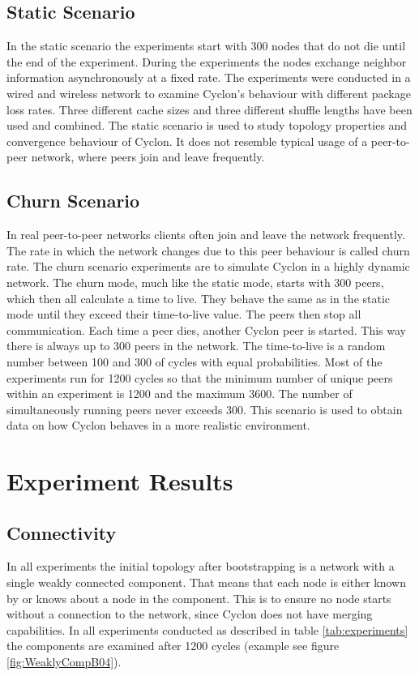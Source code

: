 \subsection{Static Scenario}
In the static scenario the experiments start with 300 nodes that do not die
until the end of the experiment. During the experiments the nodes exchange
neighbor information asynchronously at a fixed rate. The experiments were
conducted in a wired and wireless network to examine Cyclon's behaviour with
different package loss rates. Three different cache sizes and three different
shuffle lengths have been used and combined. The static scenario is used to
study topology properties and convergence behaviour of Cyclon. It does not
resemble typical usage of a peer-to-peer network, where peers join and leave
frequently.
\subsection{Churn Scenario}
In real peer-to-peer networks clients often join and leave the network
frequently. The rate in which the network changes due to this peer behaviour is
called churn rate. The churn scenario experiments are to simulate Cyclon in a
highly dynamic network. The churn mode, much like the static mode, starts with
300 peers, which then all calculate a time to live. They behave the same as in
the static mode until they exceed their time-to-live value. The peers then stop
all communication. Each time a peer dies, another Cyclon peer is started. This
way there is always up to 300 peers in the network. The time-to-live is a random
number between 100 and 300 of cycles with equal probabilities. Most of the
experiments run for 1200 cycles so that the minimum number of unique peers
within an experiment is 1200 and the maximum 3600. The number of simultaneously
running peers never exceeds 300. This scenario is used to obtain data on how
Cyclon behaves in a more realistic environment.

\section{Experiment Results}

\subsection{Connectivity}
\label{subsec:connectivity}
In all experiments the initial topology after bootstrapping is a network with a
single weakly connected component. That means that each node is either known by
or knows about a node in the component. This is to ensure no node starts
without a connection to the network, since Cyclon does not have merging
capabilities. In all experiments conducted as described in table
\ref{tab:experiments} the components are examined after 1200 cycles (example
see figure \ref{fig:WeaklyCompB04}).

